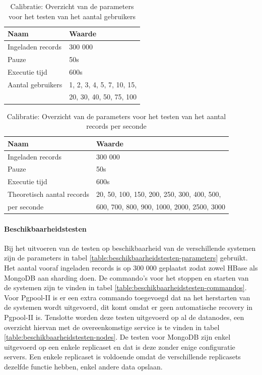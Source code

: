 \begin{table}[htb!]
	\centering
	\begin{tabular}{l| l}
	\textbf{Naam} & \textbf{Waarde}  \\
	\hline
	Ingeladen records  & 300 000 \\
	Pauze & 50s \\
	Executie tijd & 600s \\
	Aantal gebruikers & 1, 2, 3, 4, 5, 7, 10, 15, \\
	& 20, 30, 40, 50, 75, 100\\
	\end{tabular}
	\caption{Calibratie: Overzicht van de parameters voor het testen van het aantal gebruikers}
	\label{table:calibratiegebruikers}
\end{table}

\begin{table}[htb!]
	\centering
	\begin{tabular}{l| l  }
		\textbf{Naam} & \textbf{Waarde}  \\
		\hline
		Ingeladen records  & 300 000  \\
		Pauze & 50s  \\
		Executie tijd & 600s \\
		Theoretisch aantal records & 20, 50, 100, 150, 200, 250, 300, 400, 500, \\
		per seconde  & 600, 700, 800,  900, 1000, 2000, 2500, 3000\\
	\end{tabular}
	\caption{Calibratie: Overzicht van de parameters voor het testen van het aantal records per seconde}
	\label{table:calibratiequeriesperseconde}
\end{table}

\paragraph{Beschikbaarheidstesten} Bij het uitvoeren van de testen op beschikbaarheid van de verschillende systemen zijn de parameters in tabel \ref{table:beschikbaarheidstesten-parameters} gebruikt. Het aantal vooraf ingeladen records is op 300 000 geplaatst zodat zowel HBase als MongoDB aan sharding doen. De commando's voor het stoppen en starten van de systemen zijn te vinden in tabel \ref{table:beschikbaarheidstesten-commandos}.  Voor Pgpool-II is er een extra commando toegevoegd dat na het herstarten van de systemen wordt uitgevoerd, dit komt omdat er geen automatische recovery in Pgpool-II is. Tenslotte worden deze testen uitgevoerd op al de datanodes, een overzicht hiervan met de overeenkomstige service is te vinden in tabel \ref{table:beschikbaarheidstesten-nodes}. De testen voor MongoDB zijn enkel uitgevoerd op een enkele replicaset en dat is deze zonder enige configuratie servers. Een enkele replicaset is voldoende omdat de verschillende replicasets dezelfde functie hebben, enkel andere data opslaan. 

